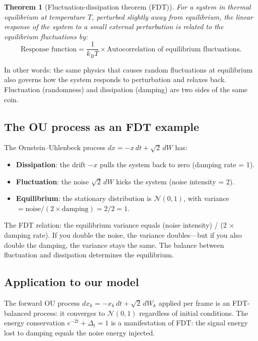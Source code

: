 \documentclass[11pt,a4paper]{article}
\newtheorem{theorem}{Theorem}[section]
\newcommand{\Dt}{\Delta_t}
\begin{document}
\begin{theorem}[Fluctuation-dissipation theorem (FDT)]
For a system in thermal equilibrium at temperature $T$, perturbed slightly away from equilibrium, the linear response of the system to a small external perturbation is related to the equilibrium fluctuations by:
\begin{equation}
  \text{Response function} = \frac{1}{k_B T}\times \text{Autocorrelation of equilibrium fluctuations}.
\end{equation}
\end{theorem}

In other words: the same physics that causes random fluctuations at equilibrium also governs how the system responds to perturbation and relaxes back.  Fluctuation (randomness) and dissipation (damping) are two sides of the same coin.

\subsection{The OU process as an FDT example}

The Ornstein--Uhlenbeck process $dx = -x\,dt + \sqrt{2}\,dW$ has:
\begin{itemize}[nosep]
  \item \textbf{Dissipation}: the drift $-x$ pulls the system back to zero (damping rate = 1).
  \item \textbf{Fluctuation}: the noise $\sqrt{2}\,dW$ kicks the system (noise intensity = 2).
  \item \textbf{Equilibrium}: the stationary distribution is $\mathcal{N}(0, 1)$, with variance $= \text{noise}/(2 \times \text{damping}) = 2/2 = 1$.
\end{itemize}

The FDT relation: the equilibrium variance equals (noise intensity) / (2 $\times$ damping rate).  If you double the noise, the variance doubles---but if you also double the damping, the variance stays the same.  The balance between fluctuation and dissipation determines the equilibrium.

\subsection{Application to our model}

The forward OU process $dx_k = -x_k\,dt + \sqrt{2}\,dW_k$ applied per frame is an FDT-balanced process: it converges to $\mathcal{N}(0, 1)$ regardless of initial conditions.  The energy conservation $e^{-2t} + \Dt = 1$ is a manifestation of FDT: the signal energy lost to damping equals the noise energy injected.
\end{document}
